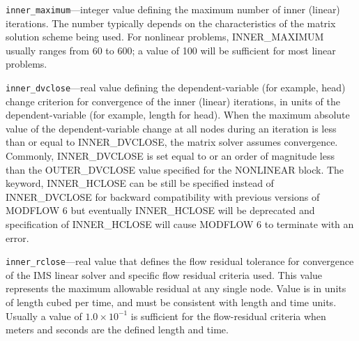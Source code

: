 \begin{description}
\item \texttt{inner\_maximum}---integer value defining the maximum number of inner (linear) iterations. The number typically depends on the characteristics of the matrix solution scheme being used. For nonlinear problems, INNER\_MAXIMUM usually ranges from 60 to 600; a value of 100 will be sufficient for most linear problems.

\item \texttt{inner\_dvclose}---real value defining the dependent-variable (for example, head) change criterion for convergence of the inner (linear) iterations, in units of the dependent-variable (for example, length for head). When the maximum absolute value of the dependent-variable change at all nodes during an iteration is less than or equal to INNER\_DVCLOSE, the matrix solver assumes convergence. Commonly, INNER\_DVCLOSE is set equal to or an order of magnitude less than the OUTER\_DVCLOSE value specified for the NONLINEAR block. The keyword, INNER\_HCLOSE can be still be specified instead of INNER\_DVCLOSE for backward compatibility with previous versions of MODFLOW 6 but eventually INNER\_HCLOSE will be deprecated and specification of INNER\_HCLOSE will cause MODFLOW 6 to terminate with an error.

\item \texttt{inner\_rclose}---real value that defines the flow residual tolerance for convergence of the IMS linear solver and specific flow residual criteria used. This value represents the maximum allowable residual at any single node.  Value is in units of length cubed per time, and must be consistent with \mf length and time units. Usually a value of $1.0 \times 10^{-1}$ is sufficient for the flow-residual criteria when meters and seconds are the defined \mf length and time.


\end{description}
